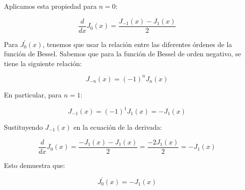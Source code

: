 \documentclass{article}
\begin{document}
    Aplicamos esta propiedad para \(n=0\):

    \[
    \frac{d}{dx} J_0(x) = \frac{J_{-1}(x) - J_{1}(x)}{2}
    \]

    Para \(J_{0}^{\prime}(x)\), tenemos que usar la relación entre las diferentes órdenes de la función de Bessel. Sabemos que para la función de Bessel de orden negativo, se tiene la siguiente relación:

    \[
    J_{-n}(x) = (-1)^n J_n(x)
    \]

    En particular, para \(n=1\):

    \[
    J_{-1}(x) = (-1)^1 J_1(x) = -J_1(x)
    \]

    Sustituyendo \(J_{-1}(x)\) en la ecuación de la derivada:

    \[
    \frac{d}{dx} J_0(x) = \frac{-J_1(x) - J_1(x)}{2} = \frac{-2J_1(x)}{2} = -J_1(x)
    \]

    Esto demuestra que:

    \[
    J_{0}^{\prime}(x)=-J_{1}(x)
    \]
\end{document}
